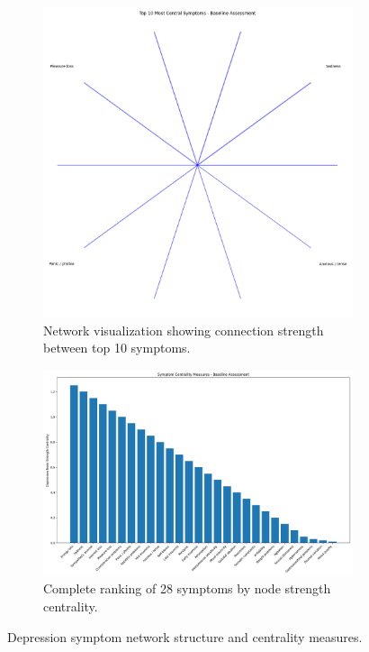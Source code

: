\documentclass{article} %
\begin{document}
\begin{figure}[h]
    \centering
    \begin{subfigure}{\textwidth}
        \includegraphics[width=\textwidth]{network_plot_0.png}
        \caption{Network visualization showing connection strength between top 10 symptoms.}
        \label{fig:network_plot}
    \end{subfigure}
    
    \begin{subfigure}{\textwidth}
        \includegraphics[width=\textwidth]{centrality_barplot_0.png}
        \caption{Complete ranking of 28 symptoms by node strength centrality.}
        \label{fig:centrality_plot}
    \end{subfigure}
    \caption{Depression symptom network structure and centrality measures.}
    \label{fig:results}
\end{figure}
\end{document}
